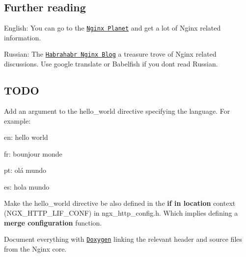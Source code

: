 \subsection*{Further reading}


\begin{DoxyItemize}
\item English\+: You can go to the \href{http://planet.nginx.org/}{\tt Nginx Planet} and get a lot of Nginx related information.
\item Russian\+: The \href{habrahabr.ru/blogs/nginx/}{\tt Habrahabr Nginx Blog} a treasure trove of Nginx related discussions. Use google translate or Babelfish if you don\textquotesingle{}t read Russian.
\end{DoxyItemize}

\subsection*{T\+O\+DO}


\begin{DoxyEnumerate}
\item Add an argument to the {\ttfamily hello\+\_\+world} directive specifying the language. For example\+:
\begin{DoxyItemize}
\item en\+: hello world
\item fr\+: bounjour monde
\item pt\+: olá mundo
\item es\+: hola mundo
\end{DoxyItemize}
\item Make the {\ttfamily hello\+\_\+world} directive be also defined in the {\bfseries if in location} context ({\ttfamily N\+G\+X\+\_\+\+H\+T\+T\+P\+\_\+\+L\+I\+F\+\_\+\+C\+O\+NF}) in {\ttfamily ngx\+\_\+http\+\_\+config.\+h}. Which implies defining a {\bfseries merge configuration} function.
\item Document everything with \href{https://secure.wikimedia.org/wikipedia/en/wiki/Doxygen}{\tt Doxygen} linking the relevant header and source files from the Nginx core. 
\end{DoxyEnumerate}